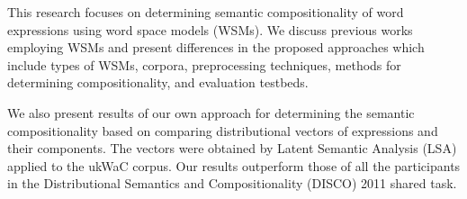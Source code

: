 This research focuses on determining semantic compositionality of word expressions using
 word space models (WSMs). We discuss
 previous works employing WSMs and present
 differences in the proposed approaches which
 include types of WSMs, corpora, preprocessing
 techniques, methods for determining compositionality,
 and evaluation testbeds.
 
 We also present results of our own approach
 for determining the semantic compositionality
 based on comparing distributional vectors of
 expressions and their components. The vectors
 were obtained by Latent Semantic Analysis
 (LSA) applied to the ukWaC corpus. Our
 results outperform those of all the participants
 in the Distributional Semantics and Compositionality
 (DISCO) 2011 shared task.


